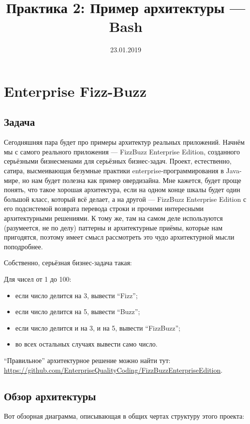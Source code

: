 \documentclass[a5paper]{article}
\title{Практика 2: Пример архитектуры --- Bash}
\date{23.01.2019}
\begin{document}
\maketitle
\thispagestyle{empty}

\section{Enterprise Fizz-Buzz}

\subsection{Задача}

Сегодняшняя пара будет про примеры архитектур реальных приложений. Начнём мы с самого реального приложения --- FizzBuzz Enterprise Edition, созданного серьёзными бизнесменами для серьёзных бизнес-задач. Проект, естественно, сатира, высмеивающая безумные практики enterprise-программирования в Java-мире, но нам будет полезна как пример овердизайна. Мне кажется, будет проще понять, что такое хорошая архитектура, если на одном конце шкалы будет один большой класс, который всё делает, а на другой --- FizzBuzz Enterprise Edition с его подсистемой возврата перевода строки и прочими интересными архитектурными решениями. К тому же, там на самом деле используются (разумеется, не по делу) паттерны и архитектурные приёмы, которые нам пригодятся, поэтому имеет смысл рассмотреть это чудо архитектурной мысли поподробнее.

Собственно, серьёзная бизнес-задача такая:

Для чисел от 1 до 100:
\begin{itemize}
	\item если число делится на 3, вывести ``Fizz'';
	\item если число делится на 5, вывести ``Buzz'';
	\item если число делится и на 3, и на 5, вывести ``FizzBuzz'';
	\item во всех остальных случаях вывести само число.
\end{itemize}

``Правильное'' архитектурное решение можно найти тут: \url{https://github.com/EnterpriseQualityCoding/FizzBuzzEnterpriseEdition}.

\subsection{Обзор архитектуры}

Вот обзорная диаграмма, описывающая в общих чертах структуру этого проекта:
\end{document}
